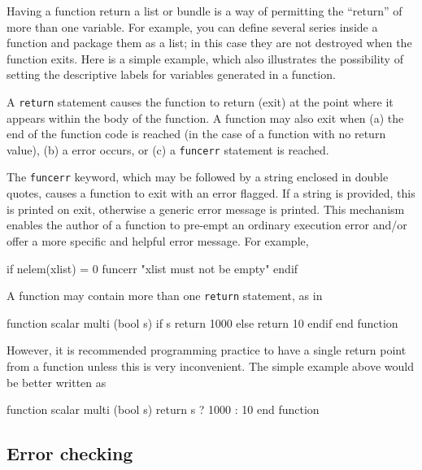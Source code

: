 Having a function return a list or bundle is a way of permitting the
``return'' of more than one variable.  For example, you can define
several series inside a function and package them as a list; in this
case they are not destroyed when the function exits.  Here is a simple
example, which also illustrates the possibility of setting the
descriptive labels for variables generated in a function.
%    

A \texttt{return} statement causes the function to return (exit) at
the point where it appears within the body of the function.  A
function may also exit when (a) the end of the function code is
reached (in the case of a function with no return value), (b) a
 error occurs, or (c) a \verb+funcerr+ statement is
reached.

The \verb+funcerr+ keyword, which may be followed by a string enclosed
in double quotes, causes a function to exit with an error flagged.  If
a string is provided, this is printed on exit, otherwise a generic
error message is printed.  This mechanism enables the author of a
function to pre-empt an ordinary execution error and/or offer a more
specific and helpful error message.  For example,
%
\begin{code}
if nelem(xlist) = 0
   funcerr "xlist must not be empty"
endif
\end{code}

A function may contain more than one \texttt{return} statement, as in
%
\begin{code}
function scalar multi (bool s)
   if s
      return 1000
   else
      return 10
   endif
end function
\end{code}
%
However, it is recommended programming practice to have a single
return point from a function unless this is very inconvenient.  The
simple example above would be better written as
%
\begin{code}
function scalar multi (bool s)
   return s ? 1000 : 10
end function
\end{code}
    

\subsection{Error checking}

